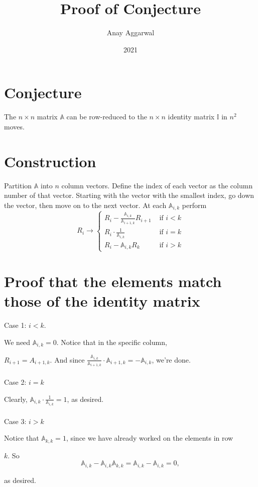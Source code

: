 \documentclass{article}
\title{Proof of Conjecture}
\author{Anay Aggarwal}
\date{2021}
\begin{document}
\maketitle

\section*{Conjecture}
The $n\times n$ matrix $\mathbb{A}$ can be row-reduced to the $n\times n$ identity matrix $\mathbb{I}$ in $n^2$ moves.
\section*{Construction}
Partition $\mathbb{A}$ into $n$ column vectors. Define the index of each vector as the column number of that vector. Starting with the vector with the smallest index, go down the vector, then move on to the next vector. At each $\mathbb{A}_{i,k}$ perform
 $$R_i\to \begin{cases} 
      R_i-\frac{\mathbb{A}_{i,k}}{\mathbb{A}_{i+1,k}}R_{i+1} & \text{ if }i<k \\
      R_i\cdot \frac{1}{
      \mathbb{A}_{i,k}}& \text{ if } i=k \\
      R_i-\mathbb{A}_{i,k}R_k & \text{ if } i>k
   \end{cases}$$
\section*{Proof that the elements match those of the identity matrix}
Case 1: $i<k$.
\par We need $\mathbb{A}_{i,k}=0$. Notice that in the specific column, \par $R_{i+1}=A_{i+1, k}$. And since $\frac{\mathbb{A}_{i,k}}{\mathbb{A}_{i+1,k}}\cdot\mathbb{A}_{i+1,k}=-\mathbb{A}_{i,k}$, we're done. 
\\ \\ Case 2: $i=k$
\par Clearly, $\mathbb{A}_{i,k}\cdot \frac{1}{\mathbb{A}_{i,k}}=1$, as desired.
\\ \\ Case 3: $i>k$
\par Notice that $\mathbb{A}_{k,k}=1$, since we have already worked on the elements in row \par $k$. So $$\mathbb{A}_{i,k}-\mathbb{A}_{i,k}\mathbb{A}_{k,k}=\mathbb{A}_{i,k}-\mathbb{A}_{i,k}=0,$$
\par as desired.
\par 
\end{document}

